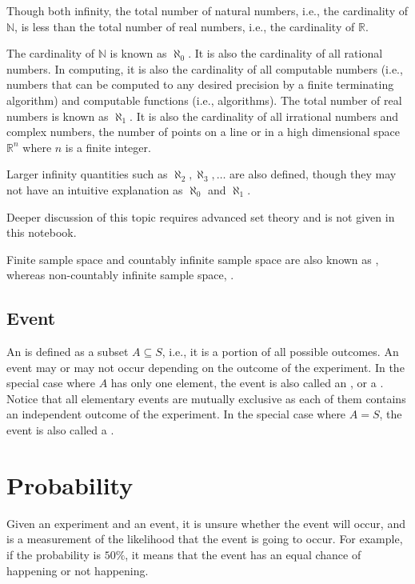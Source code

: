 \begin{shortbox}
Though both infinity, the total number of natural numbers, i.e., the cardinality of $\mathbb{N}$, is less than the total number of real numbers, i.e., the cardinality of $\mathbb{R}$.

The cardinality of $\mathbb{N}$ is known as $\aleph_0$. It is also the cardinality of all rational numbers. In computing, it is also the cardinality of all computable numbers (i.e., numbers that can be computed to any desired precision by a finite terminating algorithm) and computable functions (i.e., algorithms). The total number of real numbers is known as $\aleph_1$. It is also the cardinality of all irrational numbers and complex numbers, the number of points on a line or in a high dimensional space $\mathbb{R}^n$ where $n$ is a finite integer.

Larger infinity quantities such as $\aleph_2, \aleph_3, \ldots$ are also defined, though they may not have an intuitive explanation as $\aleph_0$ and $\aleph_1$.

Deeper discussion of this topic requires advanced set theory and is not given in this notebook.
\end{shortbox}

Finite sample space and countably infinite sample space are also known as , whereas non-countably infinite sample space, .

\subsection{Event}

An  is defined as a subset $A \subseteq S$, i.e., it is a portion of all possible outcomes. An event may or may not occur depending on the outcome of the experiment. In the special case where $A$ has only one element, the event is also called an , or a . Notice that all elementary events are mutually exclusive as each of them contains an independent outcome of the experiment. In the special case where $A=S$, the event is also called a .

\section{Probability}

Given an experiment and an event, it is unsure whether the event will occur, and  is a measurement of the likelihood that the event is going to occur. For example, if the probability is $50\%$, it means that the event has an equal chance of happening or not happening.


